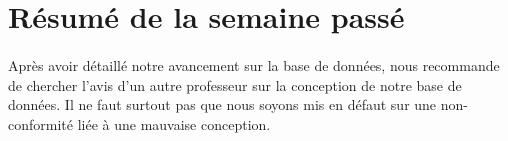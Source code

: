 \documentclass [a4paper] {article}
\begin{document}
\section{Résumé de la semaine passé}
\paragraph*{}
Après avoir détaillé notre avancement sur la base de données, \nomTuteurQualite{} nous recommande de chercher l'avis d'un autre professeur sur la conception de notre base de données. Il ne faut surtout pas que nous soyons mis en défaut sur une non-conformité liée à une mauvaise conception.

\paragraph*{}
\end{document}
